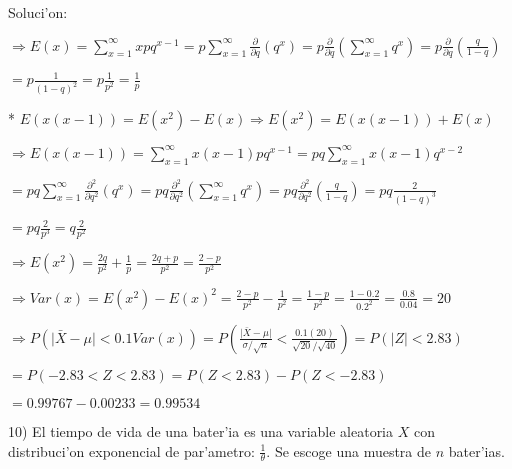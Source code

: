 \documentclass{article}
\providecommand{\abs}[1]{\lvert#1\rvert}
\begin{document}
Soluci'on:
\vspace{5mm}

$\Longrightarrow E(x) = \sum_{x = 1}^{\infty} xpq^{x-1} = p\sum_{x = 1}^{\infty} \frac{\partial}{\partial q} (q^{x}) = p\frac{\partial}{\partial q} (\sum_{x = 1}^{\infty} q^{x}) = p\frac{\partial}{\partial q} (\frac{q}{1-q})$ 
\vspace{0.5mm}

$= p\frac{1}{(1-q)^{2}} = p\frac{1}{p^{2}} = \frac{1}{p}$
\vspace{4mm}

* $E(x(x-1)) = E(x^{2})-E(x) \Longrightarrow E(x^{2}) = E(x(x-1)) + E(x)$
\vspace{4mm}

$\Longrightarrow E(x(x-1)) = \sum_{x = 1}^{\infty} x(x-1)pq^{x-1} = pq\sum_{x = 1}^{\infty} x(x-1)q^{x-2}$ 
\vspace{2mm}

$= pq\sum_{x = 1}^{\infty} \frac{\partial^{2}}{\partial q^{2}} (q^{x}) = pq\frac{\partial^{2}}{\partial q^{2}} (\sum_{x = 1}^{\infty} q^{x}) = pq\frac{\partial^{2}}{\partial q^{2}} (\frac{q}{1-q}) = pq\frac{2}{(1-q)^{3}}$ 
\vspace{2mm}

$= pq\frac{2}{p^{3}} = q\frac{2}{p^{2}}$ 
\vspace{4mm}

$\Longrightarrow E(x^{2}) = \frac{2q}{p^{2}} + \frac{1}{p} = \frac{2q+p}{p^{2}} = \frac{2-p}{p^{2}}$
\vspace{4mm}

$\Longrightarrow Var(x) = E(x^{2}) - E(x)^{2} = \frac{2-p}{p^{2}} - \frac{1}{p^{2}} = \frac{1-p}{p^{2}} = \frac{1-0.2}{0.2^{2}} = \frac{0.8}{0.04} = 20$
\vspace{4mm}

$\Longrightarrow P(\abs{\bar{X}-\mu}<0.1Var(x)) =  P(\frac{\abs{\bar{X}-\mu}}{\sigma/\sqrt{n}}<\frac{0.1(20)}{\sqrt{20}/\sqrt{40}}) = P(\abs{Z}<2.83)$
\vspace{3mm}

$= P(-2.83<Z<2.83) = P(Z<2.83)-P(Z<-2.83)$
\vspace{3mm}

$= 0.99767-0.00233 = 0.99534$
\vspace{8mm}

10) El tiempo de vida de una bater'ia es una variable aleatoria $X$ con distribuci'on exponencial de par'ametro: $\frac{1}{\theta}$. Se escoge una muestra de $n$ bater'ias.
\vspace{0.25mm}
\end{document}
